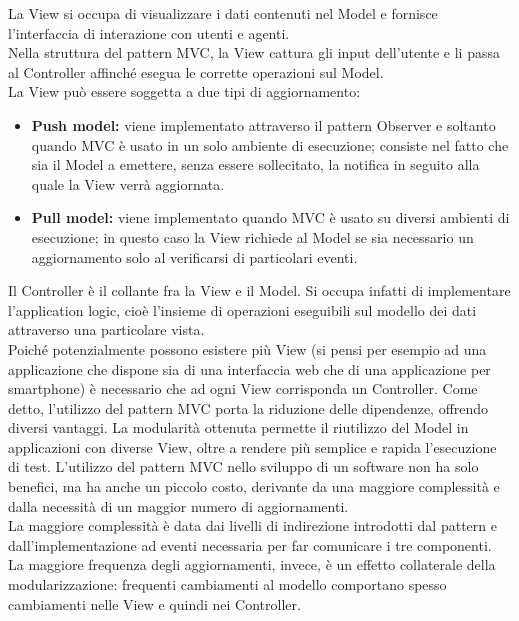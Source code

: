 				La View si occupa di visualizzare i dati contenuti nel Model e fornisce l'interfaccia di interazione con utenti e agenti.\\
				Nella struttura del pattern MVC, la View cattura gli input dell'utente e li passa al Controller affinché esegua le corrette operazioni sul Model. \\
				La View può essere soggetta a due tipi di aggiornamento:
				\begin{itemize}
					\item \textbf{Push model:} viene implementato attraverso il pattern Observer e soltanto quando MVC è usato in un solo ambiente di esecuzione; consiste nel fatto che sia il Model a emettere, senza essere sollecitato, la notifica in seguito alla quale la View verrà aggiornata.
					\item \textbf{Pull model:} viene implementato quando MVC è usato su diversi ambienti di esecuzione; in questo caso la View richiede al Model se sia necessario un aggiornamento solo al verificarsi di particolari eventi.
				\end{itemize}
				Il Controller è il collante fra la View e il Model. Si occupa infatti di implementare l'application logic, cioè l'insieme di operazioni eseguibili sul modello dei dati attraverso una particolare vista.\\
				Poiché potenzialmente possono esistere più View (si pensi per esempio ad una applicazione che dispone sia di una interfaccia web che di una applicazione per smartphone) è necessario che ad ogni View corrisponda un Controller.
			Come detto, l'utilizzo del pattern MVC porta la riduzione delle dipendenze, offrendo diversi vantaggi. La modularità ottenuta permette il riutilizzo del Model in applicazioni con diverse View, oltre a rendere più semplice e rapida l'esecuzione di test. 
			L'utilizzo del pattern MVC nello sviluppo di un software non ha solo benefici, ma ha anche un piccolo costo, derivante da una maggiore complessità e dalla necessità di un maggior numero di aggiornamenti.\\
  			La maggiore complessità è data dai livelli di indirezione introdotti dal pattern e dall'implementazione ad eventi necessaria per far comunicare i tre componenti. La maggiore frequenza degli aggiornamenti, invece, è un effetto collaterale della modularizzazione: frequenti cambiamenti al modello comportano spesso cambiamenti nelle View e quindi nei Controller.
	 \label{app:singleton}
